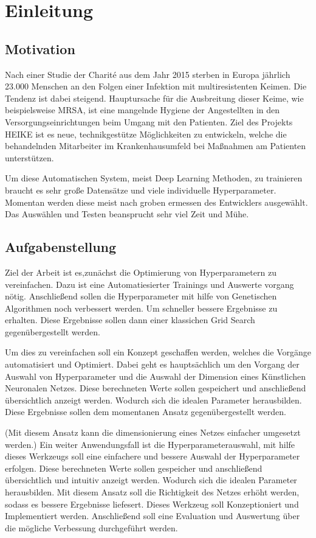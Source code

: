\section{Einleitung}

\subsection{Motivation}
\label{sec:Motivation}
Nach einer Studie der Charité aus dem Jahr 2015 sterben in Europa jährlich 23.000 Menschen an den Folgen einer Infektion mit multiresistenten Keimen. Die Tendenz ist dabei steigend. Hauptursache für die Ausbreitung dieser Keime, wie beispielsweise MRSA, ist eine mangelnde Hygiene der Angestellten in den Versorgungseinrichtungen beim Umgang mit den Patienten. Ziel des Projekts HEIKE ist es neue, technikgestütze Möglichkeiten zu entwickeln, welche die behandelnden Mitarbeiter im Krankenhausumfeld bei Maßnahmen am Patienten unterstützen. \cite{FZI_Projekt} \par

Um diese Automatischen System, meist Deep Learning Methoden, zu trainieren braucht es sehr große Datensätze und viele individuelle Hyperparameter. Momentan werden diese meist nach groben ermessen des Entwicklers ausgewählt. Das Auswählen und Testen beansprucht sehr viel Zeit und Mühe. 


\subsection{Aufgabenstellung}
\label{sec:Aufgabenstellung}
Ziel der Arbeit ist es,zunächst die Optimierung von Hyperparametern zu vereinfachen. Dazu ist eine Automatiesierter Trainings und Auswerte vorgang nötig. Anschließend sollen die Hyperparameter mit hilfe von Genetischen Algorithmen noch verbessert werden. Um schneller bessere Ergebnisse zu erhalten. Diese Ergebnisse sollen dann einer klassichen Grid Search gegenübergestellt werden. 


Um dies zu vereinfachen soll ein Konzept geschaffen werden, welches die Vorgänge automatisiert und Optimiert. Dabei geht es hauptsächlich um den Vorgang der Auswahl von Hyperparameter und die Auswahl der Dimension eines Künstlichen Neuronalen Netzes. Diese berechneten Werte sollen gespeichert und anschließend übersichtlich anzeigt werden. Wodurch sich die idealen Parameter herausbilden. Diese Ergebnisse sollen dem momentanen Ansatz gegenübergestellt werden. 


(Mit diesem Ansatz kann die dimensionierung eines Netzes einfacher umgesetzt werden.) Ein weiter Anwendungsfall ist die Hyperparameterauswahl, mit hilfe dieses Werkzeugs soll eine einfachere und bessere Auswahl der Hyperparameter erfolgen. Diese berechneten Werte sollen gespeicher und anschließend übersichtlich und intuitiv anzeigt werden. Wodurch sich die idealen Parameter herausbilden. Mit diesem Ansatz soll  die Richtigkeit des Netzes erhöht werden, sodass es bessere Ergebnisse liefesert. Dieses Werkzeug soll Konzeptioniert und Implementiert werden. Anschließend soll eine Evaluation und Auswertung über die mögliche Verbessung durchgeführt werden. 


